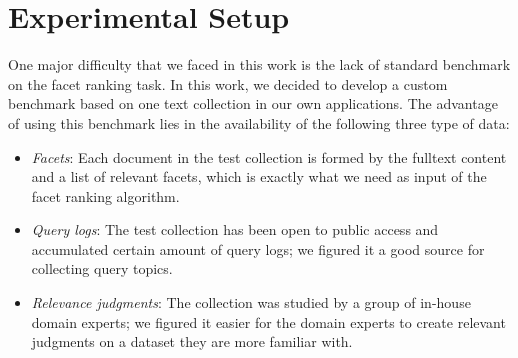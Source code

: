 \section{Experimental Setup}\label{s:experimental-setup}


One major difficulty that we faced in this work is the lack of standard
benchmark on the facet ranking task.  In this work, we decided to develop a
custom benchmark based on one text collection in our own applications.  The
advantage of using this benchmark lies in the availability of the following
three type of data:
\begin{itemize} \item \emph{Facets}: Each document in the test collection is
formed by the fulltext content and a list of relevant facets, which is exactly
what we need as input of the facet ranking algorithm.  \item \emph{Query logs}:
The test collection has been open to public access and accumulated certain
amount of query logs; we figured it a good source for collecting query topics.
\item \emph{Relevance judgments}: The collection was studied by a group of
in-house domain experts; we figured it easier for the domain experts to create
relevant judgments on a dataset they are more familiar with.  \end{itemize}

